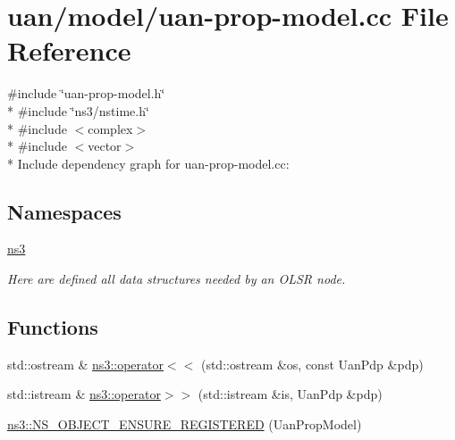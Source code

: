 \hypertarget{uan-prop-model_8cc}{}\section{uan/model/uan-\/prop-\/model.cc File Reference}
\label{uan-prop-model_8cc}
{\ttfamily \#include \char`\"{}uan-\/prop-\/model.\+h\char`\"{}}\\*
{\ttfamily \#include \char`\"{}ns3/nstime.\+h\char`\"{}}\\*
{\ttfamily \#include $<$complex$>$}\\*
{\ttfamily \#include $<$vector$>$}\\*
Include dependency graph for uan-\/prop-\/model.cc\+:
\subsection*{Namespaces}
\begin{DoxyCompactItemize}
\item 
 \hyperlink{namespacens3}{ns3}
\begin{DoxyCompactList}\small\item\em Here are defined all data structures needed by an O\+L\+SR node. \end{DoxyCompactList}\end{DoxyCompactItemize}
\subsection*{Functions}
\begin{DoxyCompactItemize}
\item 
std\+::ostream \& \hyperlink{group__uan_ga8acd7fb8a2ad8fe421d493a79d94f83d}{ns3\+::operator$<$$<$} (std\+::ostream \&os, const Uan\+Pdp \&pdp)
\item 
std\+::istream \& \hyperlink{group__uan_ga50bd32eed5adab8e06873e2be6380525}{ns3\+::operator$>$$>$} (std\+::istream \&is, Uan\+Pdp \&pdp)
\item 
\hyperlink{namespacens3_a589094042ffce94a936d1ce4ad5021f0}{ns3\+::\+N\+S\+\_\+\+O\+B\+J\+E\+C\+T\+\_\+\+E\+N\+S\+U\+R\+E\+\_\+\+R\+E\+G\+I\+S\+T\+E\+R\+ED} (Uan\+Prop\+Model)
\end{DoxyCompactItemize}
